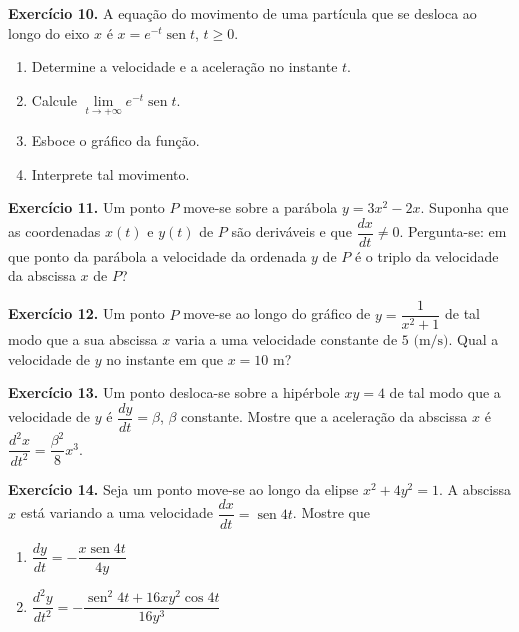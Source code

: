 \documentclass[12pt,a4paper]{article}
\begin{document}
\vspace{0.5cm}
\noindent\textbf{Exercício 10.} A equação do movimento de uma partícula que se desloca ao longo do eixo $x$ é $x = e^{-t}\operatorname{sen} t$, $t \ge 0$.
\begin{enumerate}
    \renewcommand{\theenumi}{\alph{enumi}}
    \renewcommand{\labelenumi}{\theenumi)}
    \item Determine a velocidade e a aceleração no instante $t$.
    \item Calcule $\lim\limits_{t \to +\infty} e^{-t}\operatorname{sen} t$.
    \item Esboce o gráfico da função.
    \item Interprete tal movimento.
\end{enumerate}

\vspace{0.5cm}
\noindent\textbf{Exercício 11.}
Um ponto $P$ move-se sobre a parábola $y = 3x^2 - 2x$. Suponha que as coordenadas $x(t)$ e $y(t)$ de $P$ são deriváveis e que $\dfrac{dx}{dt} \neq 0$. Pergunta-se: em que ponto da parábola a velocidade da ordenada $y$ de $P$ é o triplo da velocidade da abscissa $x$ de $P$?

\vspace{0.5cm}
\noindent\textbf{Exercício 12.}
Um ponto $P$ move-se ao longo do gráfico de $y = \dfrac{1}{x^2 + 1}$ de tal modo que a sua abscissa $x$ varia a uma velocidade constante de $5\text{ (m/s)}$. Qual a velocidade de $y$ no instante em que $x = 10\text{ m}$?

\vspace{0.5cm}
\noindent\textbf{Exercício 13.}
Um ponto desloca-se sobre a hipérbole $xy = 4$ de tal modo que a velocidade de $y$ é $\dfrac{dy}{dt} = \beta$, $\beta$ constante. Mostre que a aceleração da abscissa $x$ é $\dfrac{d^2x}{dt^2} = \dfrac{\beta^2}{8}x^3$.

\vspace{0.5cm}
\noindent\textbf{Exercício 14.} Seja um ponto move-se ao longo da elipse $x^2 + 4y^2 = 1$. A abscissa $x$ está variando a uma velocidade $\dfrac{dx}{dt} = \operatorname{sen} 4t$. Mostre que
\begin{enumerate}
    \renewcommand{\theenumi}{\alph{enumi}}
    \renewcommand{\labelenumi}{\theenumi)}
    \item $\dfrac{dy}{dt} = -\dfrac{x\operatorname{sen} 4t}{4y}$
    \item $\dfrac{d^2y}{dt^2} = -\dfrac{\operatorname{sen}^2 4t + 16xy^2 \cos 4t}{16y^3}$
\end{enumerate}
\end{document}
